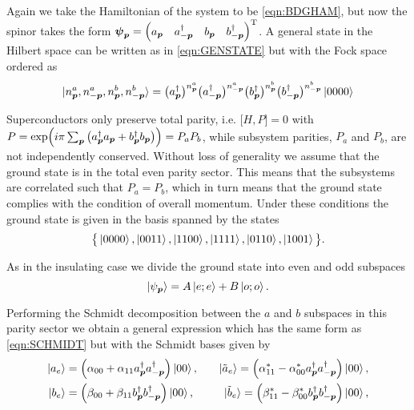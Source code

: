 Again we take the Hamiltonian of the system to be \eqref{eqn:BDGHAM}, but now the spinor takes the form $\boldsymbol{\psi}_{\boldsymbol{p}}=\begin{pmatrix} a_{\boldsymbol{p}} & a_{-\boldsymbol{p}}^{\dagger} & b_{\boldsymbol{p}} & b_{-\boldsymbol{p}}^{\dagger}\end{pmatrix} ^{\text{T}}$. A general state in the Hilbert space can be written as in \eqref{eqn:GENSTATE} but with the Fock space ordered as
\begin{equation}
    \ket{n^{a}_{\boldsymbol{p}},n^{a}_{-\boldsymbol{p}},n^{b}_{\boldsymbol{p}},n^{b}_{-\boldsymbol{p}}}=\big(a_{\boldsymbol{p}}^{\dagger}\big)^{n^{a}_{\boldsymbol{p}}}\big(a_{-\boldsymbol{p}}^{\dagger}\big)^{n^{a}_{-\boldsymbol{p}}}\big(b_{\boldsymbol{p}}^{\dagger}\big)^{n^{b}_{\boldsymbol{p}}}\big(b_{-\boldsymbol{p}}^{\dagger}\big)^{n^{b}_{-\boldsymbol{p}}}\ket{0000}
\end{equation}

\noi Superconductors only preserve total parity, i.e. $\big[H,P\big]=0$ with $P=\text{exp}\Big(i\pi\sum_{\boldsymbol{p}}\big(a^{\dagger}_{\boldsymbol{p}}a_{\boldsymbol{p}}+b_{\boldsymbol{p}}^{\dagger}b_{\boldsymbol{p}}\big)\Big)=P_{a}P_{b}$, while subsystem parities, $P_{a}$ and $P_{b}$, are not independently conserved. Without loss of generality we assume that the ground state is in the total even parity sector. This means that the subsystems are correlated such that $P_{a}=P_{b}$, which in turn means that the ground state complies with the condition of overall momentum. Under these conditions the ground state is given in the basis spanned by the states
\begin{equation}
    \big\{ \ket{0000},\ket{0011},\ket{1100},\ket{1111},\ket{0110},\ket{1001}\big\}.
\end{equation}

\noi As in the insulating case we divide the ground state into even and odd subspaces
\begin{equation}
    \ket{\psi_{\boldsymbol{p}}}=A\ket{e;e}+B\ket{o;o}.
\end{equation}

\noi Performing the Schmidt decomposition between the $a$ and $b$ subspaces in this parity sector we obtain a general expression which has the same form as \eqref{eqn:SCHMIDT} but with the Schmidt bases given by
\begin{align}\label{eqn:SUPERBASE}
    \ket{a_{e}}&=\left(\alpha_{00}+\alpha_{11}a^{\dagger}_{\boldsymbol{p}}a_{-\boldsymbol{p}}^{\dagger}\right)\ket{00}, \quad &\ket{\tilde{a}_{e}}=\left(\alpha^{*}_{11}-\alpha^{*}_{00}a^{\dagger}_{\boldsymbol{p}}a^{\dagger}_{-\boldsymbol{p}}\right)\ket{00},\nonumber\\
    \ket{b_{e}}&=\left(\beta_{00}+\beta_{11}b^{\dagger}_{\boldsymbol{p}}b_{-\boldsymbol{p}}^{\dagger}\right)\ket{00}, \quad &\ket{\tilde{b}_{e}}=\left(\beta^{*}_{11}-\beta^{*}_{00}b^{\dagger}_{\boldsymbol{p}}b^{\dagger}_{-\boldsymbol{p}}\right)\ket{00},\nonumber\\
\end{align}

